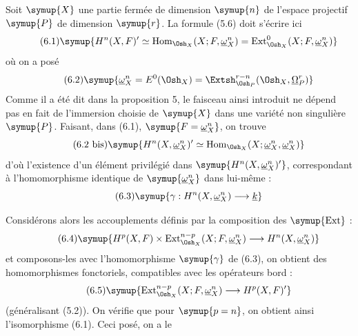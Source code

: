 Soit $\symup{X}$ une partie fermée de dimension $\symup{n}$ de l'espace projectif $\symup{P}$ de
dimension $\symup{r}$. La formule (5.6) doit s'écrire ici
\begin{equation}\tag{6.1}
  \symup{H^{n}(X,F)'
  \simeq\operatorname{Hom}_{\Osh_X}(X;F,\underline{\omega}_X^{n})
  =\operatorname{Ext}_{\Osh_X}^{0}(X;F,\underline{\omega}_X^{n})}
\end{equation}
où on a posé
\begin{equation}\tag{6.2}
  \symup{\underline{\omega}_X^{n}=E^{0}(\Osh_X)
  =\Extsh_{\Osh_P}^{r-n}(\Osh_X,\underline{\Omega}_P^{r})}
\end{equation}
Comme il a été dit dans la proposition 5, le faisceau ainsi introduit ne dépend
pas en fait de l'immersion choisie de $\symup{X}$ dans une variété non singulière $\symup{P}$.
Faisant, dans (6.1), $\symup{F=\underline{\omega}_X^{n}}$, on trouve
\begin{equation}\tag{6.2 bis}
  \symup{H^{n}(X,\underline{\omega}_X^{n})'
  \simeq\operatorname{Hom}_{\Osh_X}(X;\underline{\omega}_X^{n},\underline{\omega}_X^{n})}
\end{equation}
 d'où l'existence d'un élément
privilégié dans $\symup{H^{n}(X,\underline{\omega}_X^{n})'}$, correspondant à l'homomorphisme
identique de $\symup{\underline{\omega}_X^{n}}$ dans lui-même :
\begin{equation}\tag{6.3}
  \symup{\gamma:H^{n}(X,\underline{\omega}_X^{n})\longrightarrow\underline{k}}
\end{equation}

Considérons alors les accouplements définis par la composition des $\symup{\operatorname{Ext}}$ :
\begin{equation}\tag{6.4}
  \symup{H^{p}(X,F)\times
  \operatorname{Ext}_{\Osh_X}^{n-p}(X;F,\underline{\omega}_X^{n})
  \longrightarrow H^{n}(X,\underline{\omega}_X^{n})}
\end{equation}
et composons-les avec l'homomorphisme $\symup{\gamma}$ de (6.3), on obtient des
homomorphismes fonctoriels, compatibles avec les opérateurs bord :
\begin{equation}\tag{6.5}
  \symup{\operatorname{Ext}_{\Osh_X}^{n-p}(X;F,\underline{\omega}_X^{n})
  \longrightarrow H^{p}(X,F)'}
\end{equation}
(généralisant (5.2)). On vérifie que pour $\symup{p=n}$, on obtient ainsi
l'isomorphisme (6.1). Ceci posé, on a le


